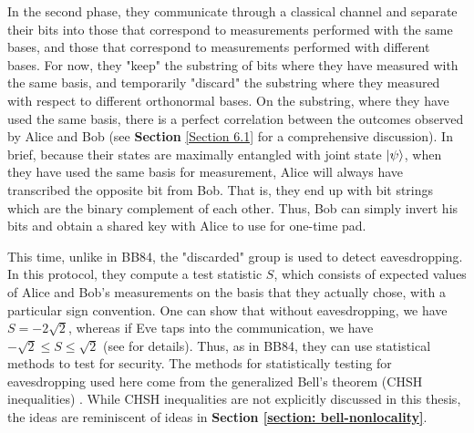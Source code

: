 In the second phase, they communicate through a classical channel and separate their bits into those that correspond to measurements performed with the same bases, and those that correspond to measurements performed with different bases.  For now, they "keep" the substring of bits where they have measured with the same basis, and temporarily "discard" the substring where they measured with respect to different orthonormal bases.  On the substring, where they have used the same basis, there is a perfect correlation between the outcomes observed by Alice and Bob (see {\bf{Section}} \ref{Section 6.1} for a comprehensive discussion).  In brief, because their states are maximally entangled with joint state $\ket{\psi}$, when they have used the same basis for measurement, Alice will always have transcribed the opposite bit from Bob. That is, they end up with bit strings which are the binary complement of each other. Thus, Bob can simply invert his bits and obtain a shared key with Alice to use for one-time pad. 

This time, unlike in BB84, the "discarded" group is used to detect eavesdropping.  In this protocol, they compute a test statistic $S$, which consists of expected values of Alice and Bob's measurements on the basis that they actually chose, with a particular sign convention.  One can show that without eavesdropping, we have $S=-2\sqrt{2}$, whereas if Eve taps into the communication, we have $-\sqrt{2} \le S \le \sqrt{2}$ (see \cite{Ekert1991} for details).  Thus, as in BB84, they can use statistical methods to test for security.  The methods for statistically testing for eavesdropping used here come from the generalized Bell's theorem (CHSH inequalities) \cite{bell1964}.  While CHSH inequalities are not explicitly discussed in this thesis, the ideas are reminiscent of ideas in \textbf{Section \ref{section: bell-nonlocality}}.

